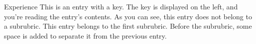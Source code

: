 \begin{rubric}{Experience}
\entry*[2008--]
  This is an entry with a key. The key is displayed on the left, and you're
  reading the entry's contents. As you can see, this entry does not belong to
  a subrubric.
\entry*[2003--2008]
  This entry belongs to the first subrubric. Before the subrubric,
  some space is added to separate it from the previous entry.
\end{rubric}